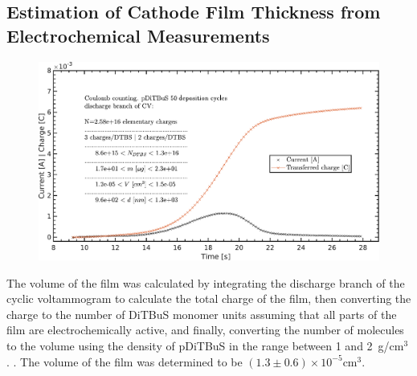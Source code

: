 \subsection*{Estimation of Cathode Film Thickness from Electrochemical Measurements}
\begin{figure}[H]
\center
	\includegraphics[width=1\textwidth]{./electrochemistry/figures/Figure_S28}
	\caption{}
	\label{fig:Figure_S28}
\end{figure}

The volume of the film was calculated by integrating the discharge branch of the cyclic voltammogram to calculate the total charge of the film, then converting the charge to the number of DiTBuS monomer units assuming that all parts of the film are electrochemically active, and finally, converting the number of molecules to the volume using the density of pDiTBuS in the range between 1 and 2~g/cm$^3$. . The volume of the film was determined to be $\left(1.3\pm0.6\right)\times10^{-5}$cm$^{3}$.\\



